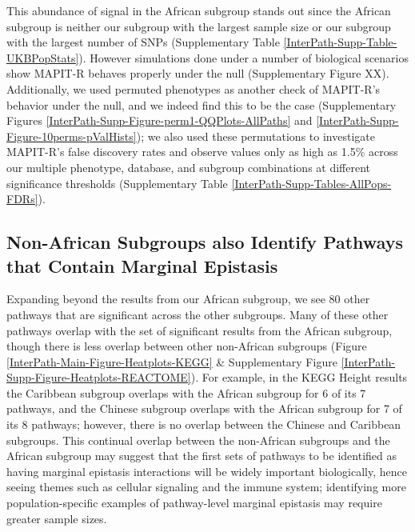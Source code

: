 \documentclass[12pt,a4paper]{article}
\begin{document}
This abundance of signal in the African subgroup stands out since the African subgroup is neither our subgroup with the largest sample size or our subgroup with the largest number of SNPs (Supplementary Table \ref{InterPath-Supp-Table-UKBPopStats}). However simulations done under a number of biological scenarios show MAPIT-R behaves properly under the null (Supplementary Figure XX). Additionally, we used permuted phenotypes as another check of MAPIT-R's behavior under the null, and we indeed find this to be the case (Supplementary Figures \ref{InterPath-Supp-Figure-perm1-QQPlots-AllPaths} and \ref{InterPath-Supp-Figure-10perms-pValHists}); we also used these permutations to investigate MAPIT-R's false discovery rates and observe values only as high as 1.5\% across our multiple phenotype, database, and subgroup combinations at different significance thresholds (Supplementary Table \ref{InterPath-Supp-Tables-AllPops-FDRs}).

\subsection{Non-African Subgroups also Identify Pathways that Contain Marginal Epistasis}

Expanding beyond the results from our African subgroup, we see 80 other pathways that are significant across the other subgroups. Many of these other pathways overlap with the set of significant results from the African subgroup, though there is less overlap between other non-African subgroups (Figure \ref{InterPath-Main-Figure-Heatplots-KEGG} \& Supplementary Figure \ref{InterPath-Supp-Figure-Heatplots-REACTOME}). For example, in the KEGG Height results the Caribbean subgroup overlaps with the African subgroup for 6 of its 7 pathways, and the Chinese subgroup overlaps with the African subgroup for 7 of its 8 pathways; however, there is no overlap between the Chinese and Caribbean subgroups. This continual overlap between the non-African subgroups and the African subgroup may suggest that the first sets of pathways to be identified as having marginal epistasis interactions will be widely important biologically, hence seeing themes such as cellular signaling and the immune system; identifying more population-specific examples of pathway-level marginal epistasis may require greater sample sizes. 
\end{document}
